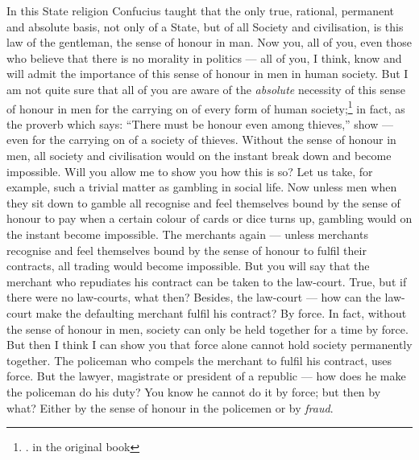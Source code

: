 In this State religion Confucius taught that the only true, rational, permanent and absolute basis, not only of a State, but of all Society and civilisation, is this law of the gentleman, the sense of honour in man.
Now you, all of you, even those who believe that there is no morality in politics --- all of you, I think, know and will admit the importance of this sense of honour in men in human society.
But I am not quite sure that all of you are aware of the \emph{absolute} necessity of this sense of honour in men for the carrying on of every form of human society;\footnote{. in the original book} in fact, as the proverb which says: ``There must be honour even among thieves,'' show --- even for the carrying on of a society of thieves.
Without the sense of honour in men, all society and civilisation would on the instant break down and become impossible.
Will you allow me to show you how this is so?
Let us take, for example, such a trivial matter as gambling in social life.
Now unless men when they sit down to gamble all recognise and feel themselves bound by the sense of honour to pay when a certain colour of cards or dice turns up, gambling would on the instant become impossible.
The merchants again --- unless merchants recognise and feel themselves bound by the sense of honour to fulfil their contracts, all trading would become impossible.
But you will say that the merchant who repudiates his contract can be taken to the law-court.
True, but if there were no law-courts, what then?
Besides, the law-court --- how can the law-court make the defaulting merchant fulfil his contract?
By force. In fact, without the sense of honour in men, society can only be held together for a time by force.
But then I think I can show you that force alone cannot hold society permanently together.
The policeman who compels the merchant to fulfil his contract, uses force.
But the lawyer, magistrate or president of a republic --- how does he make the policeman do his duty?
You know he cannot do it by force; but then by what? Either by the sense of honour in the policemen or by \emph{fraud}.

